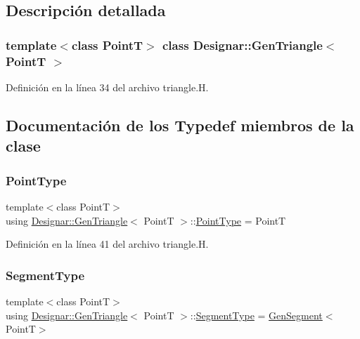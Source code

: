 \subsection{Descripción detallada}
\subsubsection*{template$<$class PointT$>$\newline
class Designar\+::\+Gen\+Triangle$<$ Point\+T $>$}



Definición en la línea 34 del archivo triangle.\+H.



\subsection{Documentación de los \textquotesingle{}Typedef\textquotesingle{} miembros de la clase}
\mbox{\label{class_designar_1_1_gen_triangle_ac6e39b72d793f44a6e12b4f0ede6d472}} 
\subsubsection{\texorpdfstring{Point\+Type}{PointType}}
{\footnotesize\ttfamily template$<$class PointT$>$ \\
using \hyperlink{class_designar_1_1_gen_triangle}{Designar\+::\+Gen\+Triangle}$<$ PointT $>$\+::\hyperlink{class_designar_1_1_gen_triangle_ac6e39b72d793f44a6e12b4f0ede6d472}{Point\+Type} =  PointT}



Definición en la línea 41 del archivo triangle.\+H.

\mbox{\label{class_designar_1_1_gen_triangle_a97d5ba127bcf8f120b1d408215956cee}} 
\subsubsection{\texorpdfstring{Segment\+Type}{SegmentType}}
{\footnotesize\ttfamily template$<$class PointT$>$ \\
using \hyperlink{class_designar_1_1_gen_triangle}{Designar\+::\+Gen\+Triangle}$<$ PointT $>$\+::\hyperlink{class_designar_1_1_gen_triangle_a97d5ba127bcf8f120b1d408215956cee}{Segment\+Type} =  \hyperlink{class_designar_1_1_gen_segment}{Gen\+Segment}$<$PointT$>$}



